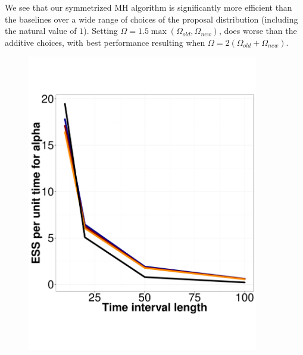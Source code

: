 We see that our symmetrized MH algorithm is significantly more efficient 
than the baselines over a wide range of choices of the proposal distribution 
(including the natural value of $1$).
Setting $\Omega = 1.5 \max(\Omega_{old}, \Omega_{new})$, does worse
than the additive choices, with best performance resulting when
$\Omega = 2(\Omega_{old} + \Omega_{new})$.

  \begin{figure}%
  \centering
  \begin{minipage}[hp]{0.45\linewidth}
  \centering
    \includegraphics [width=0.90\textwidth, angle=0]{figs/ESS_vs_t_alpha.pdf}
      \end{minipage}
  \begin{minipage}[hp]{0.45\linewidth}
  \centering

\end{minipage}
\end{figure}
